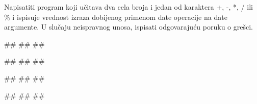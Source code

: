 \begin{Exercise}[label=KT_NG_25] 
Napisatiti program koji učitava dva cela broja i jedan od karaktera +, -, *, / ili \% i ispisuje vrednost izraza 
dobijenog primenom date operacije na date argumente. 
U slučaju neispravnog unosa, ispisati odgovarajuću poruku o grešci. 

 \begin{miditest}
\begin{upotreba}{1}
#\naslovInt#
##
##
\end{upotreba}
\end{miditest}
\begin{miditest}
\begin{upotreba}{2}
#\naslovInt#
##
##
\end{upotreba}
\end{miditest}

\begin{miditest}
\begin{upotreba}{3}
#\naslovInt#
##
##
\end{upotreba}
\end{miditest}
\begin{miditest}
\begin{upotreba}{4}
#\naslovInt#
##
##
\end{upotreba}
\end{miditest}

\end{Exercise}
\ifresenja
 \begin{Answer}[ref=KT_NG_25]
\end{Answer}
\fi


